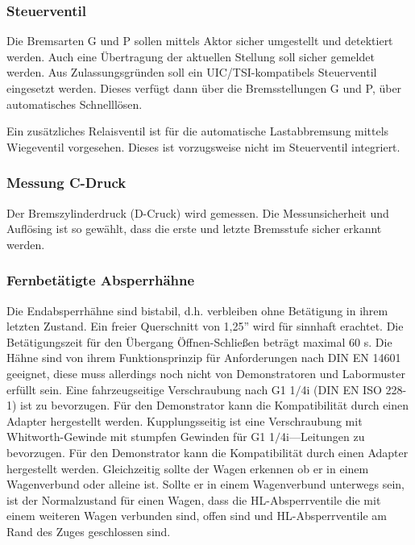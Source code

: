\subsubsection{Steuerventil}
Die Bremsarten G und P sollen mittels Aktor sicher umgestellt und detektiert werden. Auch eine Übertragung der aktuellen Stellung soll sicher gemeldet werden. Aus Zulassungsgründen soll ein UIC/TSI-kompatibels Steuerventil eingesetzt werden. Dieses verfügt dann über die Bremsstellungen G und P, über automatisches Schnelllösen. \par
Ein zusätzliches Relaisventil ist für die automatische Lastabbremsung mittels Wiegeventil vorgesehen. Dieses ist vorzugsweise nicht im Steuerventil integriert.

\subsubsection{Messung C-Druck}
Der Bremszylinderdruck (D-Cruck) wird gemessen. 
Die Messunsicherheit und Auflösing ist so gewählt, dass die erste und letzte Bremsstufe %
sicher erkannt werden. %

\subsubsection{Fernbetätigte Absperrhähne}
Die Endabsperrhähne sind bistabil, d.h. verbleiben ohne Betätigung in ihrem letzten Zustand. Ein freier Querschnitt von 1,25'' wird für sinnhaft erachtet. Die Betätigungszeit für den Übergang Öffnen-Schließen beträgt maximal 60 s. Die Hähne sind von ihrem Funktionsprinzip für Anforderungen nach DIN EN 14601 geeignet, diese muss allerdings noch nicht von Demonstratoren und Labormuster erfüllt sein. Eine fahrzeugseitige Verschraubung nach G1 1$/$4i (DIN EN ISO 228-1) ist zu bevorzugen. Für den Demonstrator kann die Kompatibilität durch einen Adapter hergestellt werden. Kupplungsseitig ist eine Verschraubung mit Whitworth-Gewinde mit stumpfen Gewinden für G1 1$⁄$4i—Leitungen zu bevorzugen. Für den Demonstrator kann die Kompatibilität durch einen Adapter hergestellt werden.
Gleichzeitig sollte der Wagen erkennen ob er in einem Wagenverbund oder alleine ist. Sollte er in einem Wagenverbund unterwegs sein, ist der Normalzustand für einen Wagen, dass die HL-Absperrventile die mit einem weiteren Wagen verbunden sind, offen sind und HL-Absperrventile am Rand des Zuges geschlossen sind.
